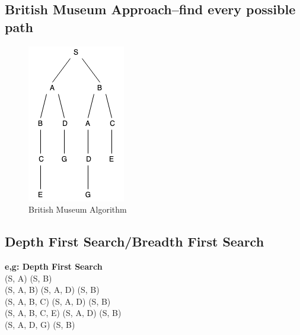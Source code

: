 \documentclass[12pt]{book}
\begin{document}
\subsection{British Museum Approach--find every possible path}
\begin{figure}[ht]
	\centering
	\includegraphics[scale=0.8]{Figure/Figure4_2.png}
	\caption{British Museum Algorithm}
\end{figure}

\subsection{Depth First Search/Breadth First Search}
\indent \indent \indent \textbf{e,g: Depth First Search}\\
\indent \indent \indent \indent (S, A) (S, B)\\
\indent \indent \indent \indent (S, A, B) (S, A, D) (S, B)\\
\indent \indent \indent \indent (S, A, B, C) (S, A, D) (S, B)\\
\indent \indent \indent \indent (S, A, B, C, E) (S, A, D) (S, B)\\
\indent \indent \indent \indent (S, A, D, G) (S, B)
\end{document}

